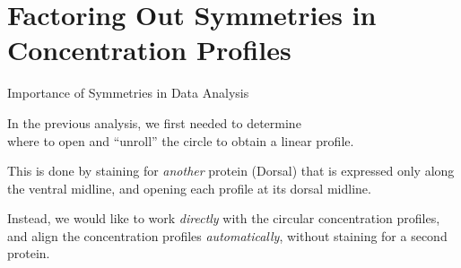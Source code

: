 \section[Factoring Out Symmetries in Concentration Profiles]{Factoring Out Symmetries in Concentration Profiles}

\begin{frame}{Importance of Symmetries in Data Analysis}

	\centering
	In the previous analysis, we first needed to determine \\where to open and ``unroll'' the circle to obtain a linear profile.
	
	\centering
	
	This is done by staining for {\em another} protein (Dorsal) that is expressed only along the ventral midline, and opening each profile at its dorsal midline. 
	
	\vspace{0.2in}
	
	Instead, we would like to work {\em directly} with the circular concentration profiles, and align the concentration profiles {\em automatically}, without staining for a second protein. 

\end{frame}

